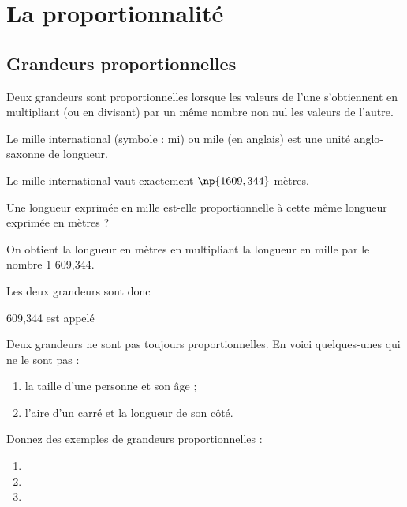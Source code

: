 \documentclass[a4paper,10pt]{report}
\begin{document}
\setcounter{chapter}{8}
\chapter{La proportionnalité}

\section{Grandeurs proportionnelles}

\begin{defn}
Deux grandeurs sont proportionnelles lorsque les valeurs de l'une s'obtiennent en multipliant (ou en divisant) par un même nombre non nul les valeurs de l'autre.
\end{defn}

\begin{ex}
Le mille international (symbole : mi) ou mile (en anglais) est une unité anglo-saxonne de longueur.

\noindent Le mille international vaut exactement $\np{1 609,344}$ mètres.

\noindent Une longueur exprimée en mille est-elle proportionnelle à cette même longueur exprimée en mètres ?

\medskip
\noindent On obtient la longueur en mètres en multipliant la longueur en mille par le nombre 1 609,344.\medskip

\noindent Les deux grandeurs sont donc \dotfill\medskip

 609,344 est appelé \dotfill
\end{ex}

\begin{rem}
Deux grandeurs ne sont pas toujours proportionnelles. En voici quelques-unes qui ne le sont pas :
\begin{enumerate}
\item[•]la taille d'une personne et son âge ;
\item[•]l'aire d'un carré et la longueur de son côté.
\end{enumerate} 
	
Donnez des exemples de grandeurs proportionnelles :\medskip
\begin{enumerate}
\item[•] \dotfill \medskip
\item[•] \dotfill \medskip
\item[•] \dotfill \medskip
\end{enumerate} 
\end{rem}
\end{document}
